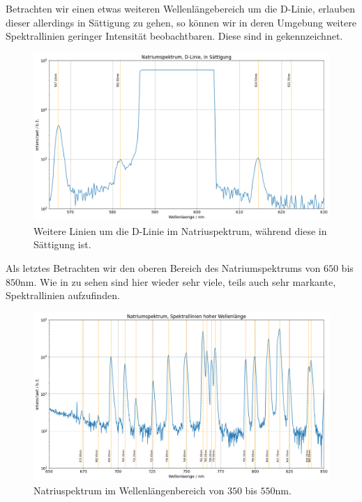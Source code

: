 Betrachten wir einen etwas weiteren Wellenlängebereich um die D-Linie, erlauben dieser allerdings in Sättigung zu gehen, so können wir in deren Umgebung weitere Spektrallinien geringer Intensität beobachtbaren. Diese sind in  gekennzeichnet.

\begin{figure}[H]
  \centering
  \includegraphics[width=.9\textwidth]{files/plots/na_spek_dlinie_saett.png}
  \caption{Weitere Linien um die D-Linie im Natriuspektrum, während diese in Sättigung ist.}
  \label{fig:na_spek_dlinie_saett}
\end{figure}

Als letztes Betrachten wir den oberen Bereich des Natriumspektrums von $650$ bis $850\si{\nano\meter}$. Wie in  zu sehen sind hier wieder sehr viele, teils auch sehr markante, Spektrallinien aufzufinden. 


\begin{figure}[H]
  \centering
  \includegraphics[width=.9\textwidth]{files/plots/na_spek_650_850.png}
  \caption{Natriuspektrum im Wellenlängenbereich von $350$ bis $550\si{\nano\meter}$.}
  \label{fig:na_spek_650_850}
\end{figure}